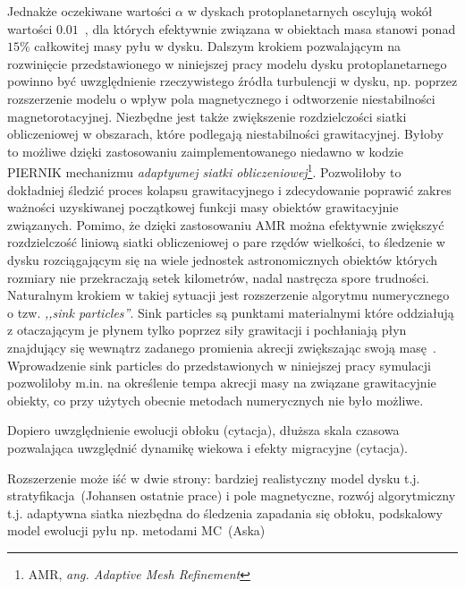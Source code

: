 Jednakże oczekiwane wartości $\alpha$ w dyskach protoplanetarnych oscylują wokół
wartości $0.01$~\cite{FD11}, dla których efektywnie związana w obiektach masa
stanowi ponad $15\%$ całkowitej masy pyłu w dysku. Dalszym krokiem pozwalającym
na rozwinięcie przedstawionego w niniejszej pracy modelu dysku protoplanetarnego
powinno być uwzględnienie rzeczywistego źródła turbulencji w dysku, np. poprzez
rozszerzenie modelu o wpływ pola magnetycznego i odtworzenie niestabilności
magnetorotacyjnej. Niezbędne jest także zwiększenie rozdzielczości siatki
obliczeniowej w obszarach, które podlegają niestabilności grawitacyjnej. Byłoby
to możliwe dzięki zastosowaniu zaimplementowanego niedawno w kodzie \textsc{PIERNIK}
mechanizmu \emph{adaptywnej siatki obliczeniowej}\footnote{AMR, \emph{ang.
Adaptive Mesh Refinement}}. Pozwoliłoby to dokładniej śledzić proces kolapsu
grawitacyjnego i zdecydowanie poprawić zakres ważności uzyskiwanej początkowej
funkcji masy obiektów grawitacyjnie związanych. Pomimo, że dzięki zastosowaniu
AMR można efektywnie zwiększyć rozdzielczość liniową siatki obliczeniowej o pare
rzędów wielkości, to śledzenie w dysku rozciągającym się na wiele jednostek
astronomicznych obiektów których rozmiary nie przekraczają setek kilometrów,
nadal nastręcza spore trudności. Naturalnym krokiem w takiej sytuacji jest
rozszerzenie algorytmu numerycznego o tzw. \emph{,,sink particles''}. Sink
particles są punktami materialnymi które oddziałują z otaczającym je płynem
tylko poprzez siły grawitacji i pochłaniają płyn znajdujący się wewnątrz zadanego
promienia akrecji zwiększając swoją masę~\cite{FBCK10}. Wprowadzenie sink
particles do przedstawionych w niniejszej pracy symulacji pozwoliloby m.in. na
określenie tempa akrecji masy na związane grawitacyjnie obiekty, co przy użytych
obecnie metodach numerycznych nie było możliwe.

\par Dopiero uwzględnienie ewolucji obłoku (cytacja), dłuższa skala czasowa
pozwalająca uwzględnić dynamikę wiekowa i efekty migracyjne (cytacja).


\par Rozszerzenie może iść w dwie strony: bardziej realistyczny model dysku t.j.
stratyfikacja~(Johansen ostatnie prace) i pole magnetyczne, rozwój
algorytmiczny t.j. adaptywna siatka niezbędna do śledzenia zapadania się
obłoku, podskalowy model ewolucji pyłu np.  metodami MC~(Aska)


